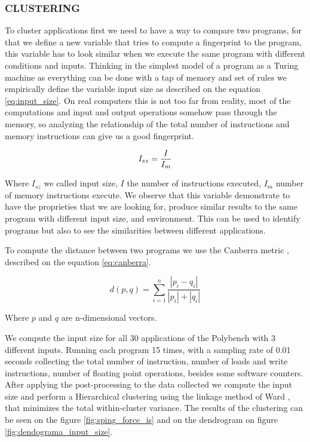 \subsubsection{CLUSTERING}

To cluster applications first we need to have a way to compare two programs, for that we define a new variable that tries to compute a fingerprint to the program, this variable has to look similar when we execute the same program with different conditions and inputs. Thinking in the simplest model of a program as a Turing machine as everything can be done with a tap of memory and set of rules we empirically define the variable input size as described on the equation \ref{eq:input_size}. On real computers this is not too far from reality, most of the computations and input and output operations somehow pass through the memory, so analyzing the relationship of the total number of instructions and memory instructions can give us a good fingerprint.

\begin{equation}
    I_{sz} = \frac{I}{I_{m}} \\
    \label{eq:input_size}
\end{equation}

Where $I_{sz}$ we called input size, $I$ the number of instructions executed, $I_m$ number of memory instructions execute. We observe that this variable demonstrate to have the proprieties that we are looking for, produce similar results to the same program with different input size, and environment. This can be used to identify programs but also to see the similarities between different applications.

To compute the distance between two programs we use the Canberra metric \cite{Jurman2009CanberraLists}, described on the equation \ref{eq:canberra}.

\begin{equation}
    d(p,q)= \sum_{i=1}^{n}{\frac{|p_i-q_i|}{|p_i|+|q_i|}}
    \label{eq:canberra}
\end{equation}

Where $p$ and $q$ are n-dimensional vectors.

We compute the input size for all 30 applications of the Polybench with 3 different inputs. Running each program 15 times, with a sampling rate of 0.01 seconds collecting the total number of instruction, number of loads and write instructions, number of floating point operations, besides some software counters. After applying the post-processing to the data collected we compute the input size and perform a Hierarchical clustering using the linkage method of Ward \cite{Murtagh2011WardsAlgorithm}, that minimizes the total within-cluster variance. The results of the clustering can be seen on the figure \ref{fig:sping_force_is} and on the dendrogram on figure \ref{fig:dendograma_input_size}.

